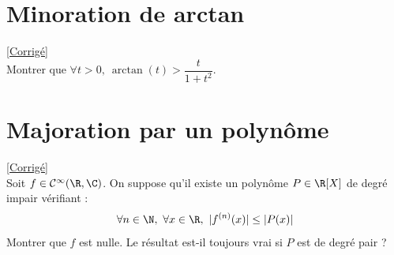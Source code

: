 \documentclass{book}
\begin{document}
	\section{Minoration de arctan }
	\textcolor{blue}{\hyperref[Minoration de arctan corrigé]{[Corrigé]}}\\
	\label{Minoration de arctan}
	Montrer que $\forall t>0,\ \arctan(t)>\dfrac{t}{1+t^2}$.
	
	\section{Majoration par un polynôme }
	\textcolor{blue}{\hyperref[Majoration par un polynôme corrigé]{[Corrigé]}}\\
	\label{Majoration par un polynôme}
	Soit $f\in \mathcal C^\infty(\R,\C)$. On suppose qu'il existe un polynôme $P\in \R[X]$ de degré impair vérifiant :
	$$\forall n\in \N,\ \forall x\in \R,\ |f^{(n)}(x)|\leq |P(x)|$$
	Montrer que $f$ est nulle. Le résultat est-il toujours vrai si $P$ est de degré pair ?
	
\end{document}
